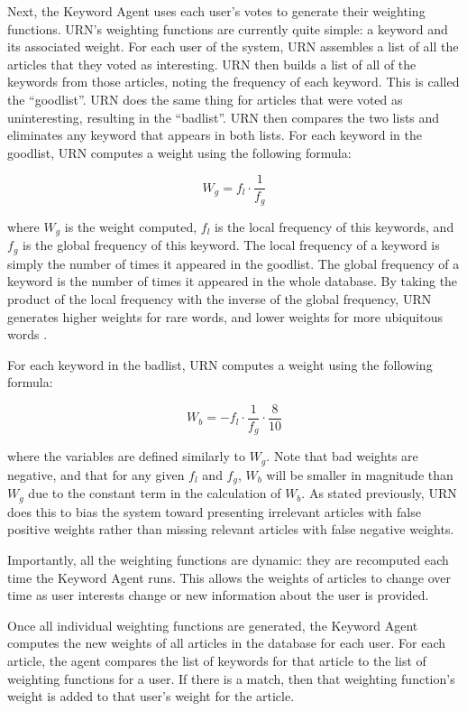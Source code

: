 Next, the Keyword Agent uses each user's votes to generate their weighting
functions. URN's weighting functions are currently quite simple: a keyword
and its associated weight. For each user of the system, URN assembles a
list of all the articles that they voted as interesting.  URN then builds a
list of all of the keywords from those articles, noting the frequency of
each keyword. This is called the ``goodlist''.  URN does the same thing for
articles that were voted as uninteresting, resulting in the ``badlist''.
URN then compares the two lists and eliminates any keyword that appears in
both lists.  For each keyword in the goodlist, URN computes a weight using
the following formula:

\begin{displaymath}
W_g = f_l \cdot \frac{1}{f_g}
\end{displaymath}

where $W_g$ is the weight computed, $f_l$ is the local frequency of this
keywords, and $f_g$ is the global frequency of this keyword. The local
frequency of a keyword is simply the number of times it appeared in the
goodlist. The global frequency of a keyword is the number of times it appeared
in the whole database. By taking the product of the local frequency with the
inverse of the global frequency, URN generates higher weights for rare
words, and lower weights for more ubiquitous words
\cite{cacm-infofiltering-92}.

For each keyword in the badlist, URN computes a weight using the following
formula:

\begin{displaymath}
W_b = - f_l \cdot \frac{1}{f_g} \cdot \frac{8}{10}
\end{displaymath}

where the variables are defined similarly to $W_g$. Note that bad weights
are negative, and that for any given $f_l$ and $f_g$, $W_b$ will be smaller
in magnitude than $W_g$ due to the constant term in the calculation of
$W_b$.  As stated previously, URN does this to bias the system toward
presenting irrelevant articles with false positive weights rather than
missing relevant articles with false negative weights.

Importantly, all the weighting functions are dynamic: they are recomputed
each time the Keyword Agent runs. This allows the weights of articles to
change over time as user interests change or new information about the user
is provided.

Once all individual weighting functions are generated, the Keyword Agent
computes the new weights of all articles in the database for each user. For
each article, the agent compares the list of keywords for that article to
the list of weighting functions for a user. If there is a match, then that
weighting function's weight is added to that user's weight for the article.
